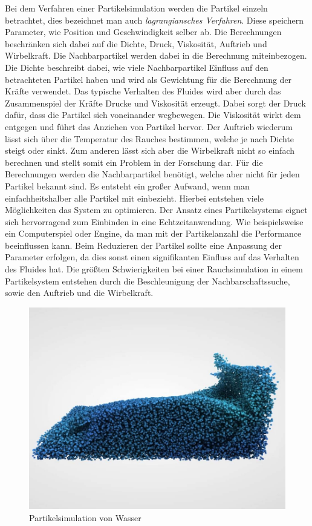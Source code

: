 \documentclass[intern,palatino]{cgBA}
\begin{document}
Bei dem Verfahren einer Partikelsimulation werden die Partikel einzeln betrachtet, dies bezeichnet man auch \textit{lagrangiansches Verfahren}. Diese speichern Parameter, wie Position und Geschwindigkeit selber ab. Die Berechnungen beschränken sich dabei auf die Dichte, Druck, Viskosität, Auftrieb und Wirbelkraft.
Die Nachbarpartikel werden dabei in die Berechnung miteinbezogen. Die Dichte beschreibt dabei, wie viele Nachbarpartikel Einfluss auf den betrachteten Partikel haben und wird als Gewichtung für die Berechnung der Kräfte verwendet. Das typische Verhalten des Fluides wird aber durch das Zusammenspiel der Kräfte Drucke und Viskosität erzeugt. Dabei sorgt der Druck dafür, dass die Partikel sich voneinander wegbewegen. Die Viskosität wirkt dem entgegen und führt das Anziehen von Partikel hervor. Der Auftrieb wiederum lässt sich über die Temperatur des Rauches bestimmen, welche je nach Dichte steigt oder sinkt. Zum anderen lässt sich aber die Wirbelkraft nicht so einfach berechnen und stellt somit ein Problem in der Forschung dar.
Für die Berechnungen werden die Nachbarpartikel benötigt, welche aber nicht für jeden Partikel bekannt sind. Es entsteht ein großer Aufwand, wenn man einfachheitshalber alle Partikel mit einbezieht. Hierbei entstehen viele Möglichkeiten das System zu optimieren.
\newline
Der Ansatz eines Partikelsystems eignet sich hervorragend zum Einbinden in eine Echtzeitanwendung. Wie beispielsweise ein Computerspiel oder Engine, da man mit der Partikelanzahl  die Performance beeinflussen kann. Beim Reduzieren der Partikel sollte eine Anpassung der Parameter erfolgen, da dies sonst einen signifikanten Einfluss auf das Verhalten des Fluides hat.
\newline
Die größten Schwierigkeiten bei einer Rauchsimulation in einem Partikelsystem entstehen durch die Beschleunigung der Nachbarschaftssuche, sowie den Auftrieb und die Wirbelkraft.
\begin{figure}[h]
	\centering
	\includegraphics[width=0.7\columnwidth]{Bilder/partikelsystem.jpg}
	\caption[Partikelsimulation von Wasser \newline \url{https://i.ytimg.com/vi/DhNt_A3k4B4/maxresdefault.jpg}]{Partikelsimulation von Wasser}
	\label{img:Partikelsystem}
\end{figure}
\end{document}
